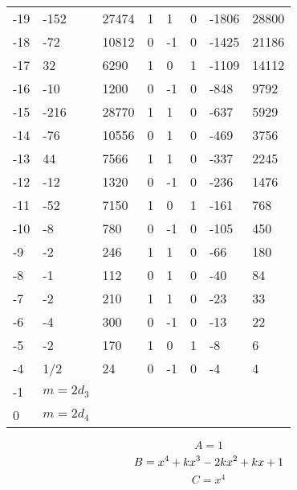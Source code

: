 \documentclass{amsart}
\begin{document}
\begin{longtable}{|l|l|l|lllll|}
-19&-152&27474&1&1&0&-1806&28800\\
-18&-72&10812&0&-1&0&-1425&21186\\
-17&32&6290&1&0&1&-1109&14112\\
-16&-10&1200&0&-1&0&-848&9792\\
-15&-216&28770&1&1&0&-637&5929\\
-14&-76&10556&0&1&0&-469&3756\\
-13&44&7566&1&1&0&-337&2245\\
-12&-12&1320&0&-1&0&-236&1476\\
-11&-52&7150&1&0&1&-161&768\\
-10&-8&780&0&-1&0&-105&450\\
-9&-2&246&1&1&0&-66&180\\
-8&-1&112&0&1&0&-40&84\\
-7&-2&210&1&1&0&-23&33\\
-6&-4&300&0&-1&0&-13&22\\
-5&-2&170&1&0&1&-8&6\\
-4&1/2&24&0&-1&0&-4&4\\
-1&$m=2d_{3}$&&\multicolumn{5}{c|}{}\\
0&$m=2d_{4}$&&\multicolumn{5}{c|}{}\\
\hline
\end{longtable}
$$A=1$$
$$B=x^4
 + k\*x^3
 - 2\*k\*x^2
 + k\*x
 + 1$$
$$C=x^4$$
\end{document}
